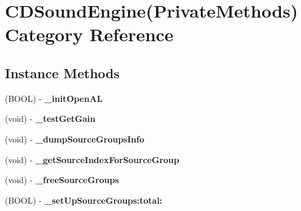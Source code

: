 \hypertarget{categoryCDSoundEngine_07PrivateMethods_08}{}\section{C\+D\+Sound\+Engine(Private\+Methods) Category Reference}
\label{categoryCDSoundEngine_07PrivateMethods_08}
\subsection*{Instance Methods}
\begin{DoxyCompactItemize}
\item 
\mbox{\label{categoryCDSoundEngine_07PrivateMethods_08_aefd4b4cb3b3a07068e2438b2b4f2a3c8}} 
(B\+O\+OL) -\/ {\bfseries \+\_\+init\+Open\+AL}
\item 
\mbox{\label{categoryCDSoundEngine_07PrivateMethods_08_a7363c48562f49a17d3d82079cd6bce4b}} 
(void) -\/ {\bfseries \+\_\+test\+Get\+Gain}
\item 
\mbox{\label{categoryCDSoundEngine_07PrivateMethods_08_a8a0e3e538ac804c39b0b9ac53e7fb13f}} 
(void) -\/ {\bfseries \+\_\+dump\+Source\+Groups\+Info}
\item 
\mbox{\label{categoryCDSoundEngine_07PrivateMethods_08_a65c2b77030a096474b6962bb9b3a8294}} 
(void) -\/ {\bfseries \+\_\+get\+Source\+Index\+For\+Source\+Group}
\item 
\mbox{\label{categoryCDSoundEngine_07PrivateMethods_08_a1d1eb0f2b085ebb69b25239e453ec448}} 
(void) -\/ {\bfseries \+\_\+free\+Source\+Groups}
\item 
\mbox{\label{categoryCDSoundEngine_07PrivateMethods_08_a0cd2d907a4f4a71ba2bac55dea8a9ea3}} 
(B\+O\+OL) -\/ {\bfseries \+\_\+set\+Up\+Source\+Groups\+:total\+:}
\item 
\mbox{\label{categoryCDSoundEngine_07PrivateMethods_08_aefd4b4cb3b3a07068e2438b2b4f2a3c8}} 

\end{DoxyCompactItemize}
